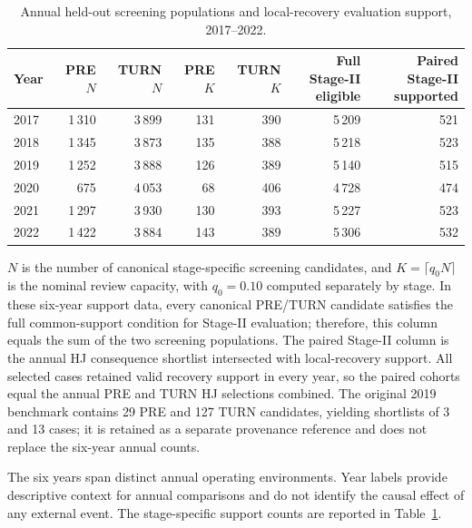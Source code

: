 \begin{table}[pos=t]
\centering
\caption{Annual held-out screening populations and local-recovery evaluation support, 2017--2022.}
\label{tab:annual_evaluation_support}
\scriptsize
\setlength{\tabcolsep}{3pt}
\begin{tabular}{lrrrrrr}
\toprule
Year & \shortstack{PRE\\$N$} & \shortstack{TURN\\$N$} & \shortstack{PRE\\$K$} & \shortstack{TURN\\$K$} & \shortstack{Full Stage-II\\eligible} & \shortstack{Paired Stage-II\\supported} \\
\midrule
2017 & 1\,310 & 3\,899 & 131 & 390 & 5\,209 & 521 \\
2018 & 1\,345 & 3\,873 & 135 & 388 & 5\,218 & 523 \\
2019 & 1\,252 & 3\,888 & 126 & 389 & 5\,140 & 515 \\
2020 & 675 & 4\,053 & 68 & 406 & 4\,728 & 474 \\
2021 & 1\,297 & 3\,930 & 130 & 393 & 5\,227 & 523 \\
2022 & 1\,422 & 3\,884 & 143 & 389 & 5\,306 & 532 \\
\bottomrule
\end{tabular}
\par\vspace{3pt}
\begin{minipage}{0.98\linewidth}
\footnotesize
$N$ is the number of canonical stage-specific screening candidates, and $K=\lceil q_0N\rceil$ is the nominal review capacity, with $q_0=0.10$ computed separately by stage. In these six-year support data, every canonical PRE/TURN candidate satisfies the full common-support condition for Stage-II evaluation; therefore, this column equals the sum of the two screening populations. The paired Stage-II column is the annual HJ consequence shortlist intersected with local-recovery support. All selected cases retained valid recovery support in every year, so the paired cohorts equal the annual PRE and TURN HJ selections combined. The original 2019 benchmark contains 29 PRE and 127 TURN candidates, yielding shortlists of 3 and 13 cases; it is retained as a separate provenance reference and does not replace the six-year annual counts.
\end{minipage}
\end{table}

The six years span distinct annual operating environments. Year labels provide descriptive context for annual comparisons and do not identify the causal effect of any external event. The stage-specific support counts are reported in Table~\ref{tab:annual_evaluation_support}.

